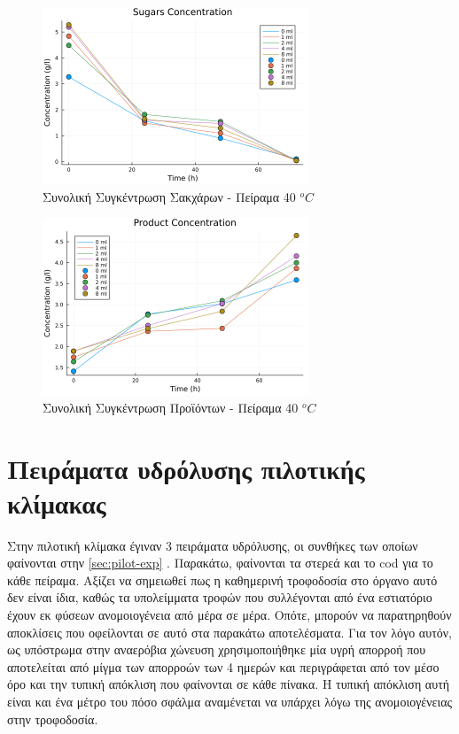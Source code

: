 \documentclass[11pt]{report}
\begin{document}
\begin{enumerate}
\begin{figure}[htbp]
\centering
\includegraphics[width=300px]{../plots/28_11/sugars_conc_scatter_28_11.png}
\caption{\label{fig:org1affc46}Συνολική Συγκέντρωση Σακχάρων - Πείραμα 40 \(^oC\)}
\end{figure}

\begin{figure}[htbp]
\centering
\includegraphics[width=300px]{../plots/28_11/product_conc_scatter_28_11.png}
\caption{\label{fig:org754ce98}Συνολική Συγκέντρωση Προϊόντων - Πείραμα 40 \(^oC\)}
\end{figure}
\end{enumerate}

\section{Πειράματα υδρόλυσης πιλοτικής κλίμακας}
\label{sec:orgdf5ab29}
Στην πιλοτική κλίμακα έγιναν 3 πειράματα υδρόλυσης, οι συνθήκες των οποίων φαίνονται στην \autoref{sec:pilot-exp} . Παρακάτω, φαίνονται τα στερεά και το \acrshort{cod} για το κάθε πείραμα. Αξίζει να σημειωθεί πως η καθημερινή τροφοδοσία στο όργανο αυτό δεν είναι ίδια, καθώς τα υπολείμματα τροφών που συλλέγονται από ένα εστιατόριο έχουν εκ φύσεων ανομοιογένεια από μέρα σε μέρα. Οπότε, μπορούν να παρατηρηθούν αποκλίσεις που οφείλονται σε αυτό στα παρακάτω αποτελέσματα. Για τον λόγο αυτόν, ως υπόστρωμα στην αναερόβια χώνευση χρησιμοποιήθηκε μία υγρή απορροή που αποτελείται από μίγμα των απορροών των 4 ημερών και περιγράφεται από τον μέσο όρο και την τυπική απόκλιση που φαίνονται σε κάθε πίνακα. Η τυπική απόκλιση αυτή είναι και ένα μέτρο του πόσο σφάλμα αναμένεται να υπάρχει λόγω της ανομοιογένειας στην τροφοδοσία.
\end{document}
